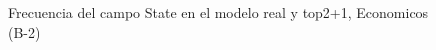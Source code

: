 \begin{figure}[H]
    \centering
    
    \caption{Frecuencia del campo State en el modelo real y top2+1, Economicos (B-2)}
    \label{frecuency-State-top2+1}
\end{figure}